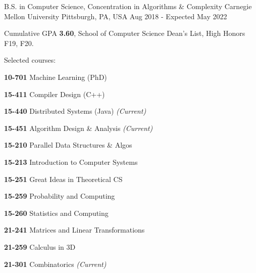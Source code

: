 

\begin{cventries}

  \eduentry
    {B.S. in Computer Science, Concentration in Algorithms \& Complexity} %
    {Carnegie Mellon University} %
    {Pittsburgh, PA, USA} %
    {Aug 2018 - Expected May 2022} %
    {
      \begin{cvitems} %
      \item {Cumulative GPA \textbf{3.60}, School of Computer Science Dean's List, High Honors F19, F20. }
      \item {Selected courses:}
        \setlength\multicolsep{0pt}
        \begin{multicols}{3}
          \item[] {\textbf{10-701} Machine Learning (PhD)}
          \item[] {\textbf{15-411} Compiler Design (C++)}
          \item[] {\textbf{15-440} Distributed Systems (Java) \textit{\color{awesome}(Current)}}
          \item[] {\textbf{15-451} Algorithm Design \& Analysis \textit{\color{awesome}(Current)}}
          \item[] {\textbf{15-210} Parallel Data Structures \& Algos}
          \item[] {\textbf{15-213} Introduction to Computer Systems}
          \item[] {\textbf{15-251} Great Ideas in Theoretical CS}
          \item[] {\textbf{15-259} Probability and Computing}
          \item[] {\textbf{15-260} Statistics and Computing}
          \item[] {\textbf{21-241} Matrices and Linear Transformations}
          \item[] {\textbf{21-259} Calculus in 3D}
          \item[] {\textbf{21-301} Combinatorics \textit{\color{awesome}(Current)}}
        \end{multicols}
      \end{cvitems}
    }
\end{cventries}
